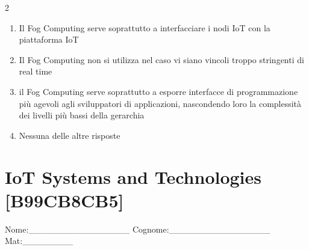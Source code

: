 \documentclass[10pt]{article}
\begin{document}
\begin{multicols}{2}
\begin{enumerate}[label=\arabic*.]
\item Il Fog Computing serve soprattutto a interfacciare i nodi IoT con la piattaforma IoT
\item Il Fog Computing non si utilizza nel caso vi siano vincoli troppo stringenti di real time
\item il Fog Computing serve soprattutto a esporre interfacce di programmazione più agevoli agli sviluppatori di applicazioni, nascondendo loro la complessità dei livelli più bassi della gerarchia
\item Nessuna delle altre risposte
\end{enumerate}
\end{multicols}

\newpage

\section*{IoT Systems and Technologies \footnotesize [B99CB8CB5]}
{\footnotesize Nome:\_\_\_\_\_\_\_\_\_\_\_\_\_\_\_\_ Cognome:\_\_\_\_\_\_\_\_\_\_\_\_\_\_\_\_ Mat:\_\_\_\_\_\_\_\_}
\end{document}
